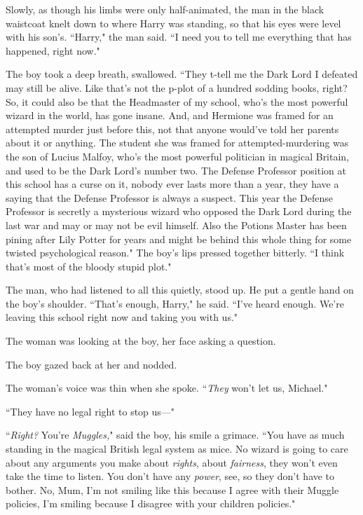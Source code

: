Slowly, as though his limbs were only half-animated, the man in the black waistcoat knelt down to where Harry was standing, so that his eyes were level with his son's. ``Harry," the man said. ``I need you to tell me everything that has happened, right now."

The boy took a deep breath, swallowed. ``They t-tell me the Dark Lord I defeated may still be alive. Like that's not the p-plot of a hundred sodding books, right? So, it could also be that the Headmaster of my school, who's the most powerful wizard in the world, has gone insane. And, and Hermione was framed for an attempted murder just before this, not that anyone would've told her parents about it or anything. The student she was framed for attempted-murdering was the son of Lucius Malfoy, who's the most powerful politician in magical Britain, and used to be the Dark Lord's number two. The Defense Professor position at this school has a curse on it, nobody ever lasts more than a year, they have a saying that the Defense Professor is always a suspect. This year the Defense Professor is secretly a mysterious wizard who opposed the Dark Lord during the last war and may or may not be evil himself. Also the Potions Master has been pining after Lily Potter for years and might be behind this whole thing for some twisted psychological reason." The boy's lips pressed together bitterly. ``I think that's most of the bloody stupid plot."

The man, who had listened to all this quietly, stood up. He put a gentle hand on the boy's shoulder. ``That's enough, Harry," he said. ``I've heard enough. We're leaving this school right now and taking you with us."

The woman was looking at the boy, her face asking a question.

The boy gazed back at her and nodded.

The woman's voice was thin when she spoke. ``\emph{They} won't let us, Michael."

``They have no legal right to stop us—"

``\emph{Right?} You're \emph{Muggles,}" said the boy, his smile a grimace. ``You have as much standing in the magical British legal system as mice. No wizard is going to care about any arguments you make about \emph{rights}, about \emph{fairness}, they won't even take the time to listen. You don't have any \emph{power}, see, so they don't have to bother. No, Mum, I'm not smiling like this because I agree with their Muggle policies, I'm smiling because I disagree with your children policies."


